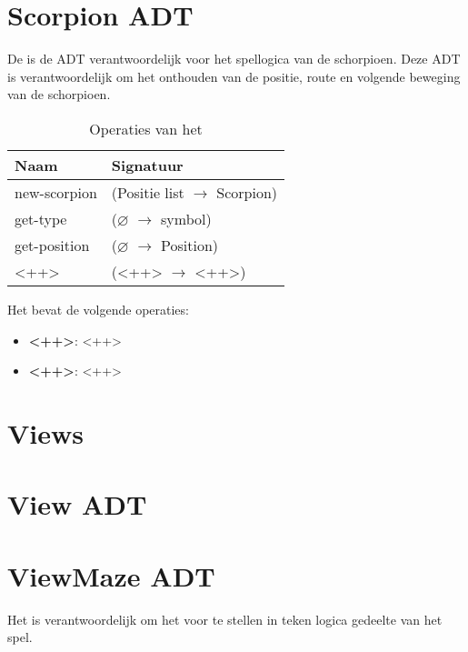 \section{Scorpion ADT}
\label{section:scorpion}
De \texttt{} is de ADT verantwoordelijk voor het spellogica van de schorpioen. 
Deze ADT is verantwoordelijk om het onthouden van de positie, route en volgende beweging van de schorpioen.

\begin{table}[hbt]
\centering
\begin{tabular}{|ll|}
\hline
\rowcolor[HTML]{000000} 
{\color[HTML]{FFFFFF} \textbf{Naam}} & {\color[HTML]{FFFFFF} \textbf{Signatuur}} \\ \hline
new-scorpion    & (Positie list $\rightarrow$ Scorpion) \\ \hline
get-type      & ($\varnothing$ $\rightarrow$ symbol)                        \\ \hline
get-position  & ($\varnothing$ $\rightarrow$ Position)                        \\ \hline
<++>                                 & (<++> $\rightarrow$ <++>)                                       \\ \hline
\end{tabular}
\caption{Operaties van het \texttt{}}
\label{table:scorpion}
\end{table}

Het \texttt{} bevat de volgende operaties:

\begin{itemize}
	\item \textbf{<++>}: <++>
	\item \textbf{<++>}: <++>
\end{itemize}

\section{Views}
\label{view}
\section{View ADT}
\label{section:view}
\section{View\textunderscore Maze ADT}
\label{section:view_maze}

Het \texttt{} is verantwoordelijk om het \texttt{} voor te stellen in teken logica gedeelte van het spel.

